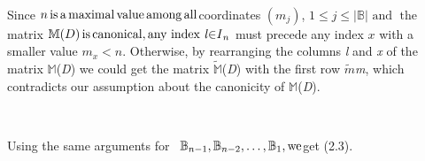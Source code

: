 \documentclass{article}
\newcommand{\infixand}{\text{ and }}
\newcommand{\tmem}[1]{{\em #1\/}}
\newcommand{\tmop}[1]{\ensuremath{\operatorname{#1}}}
\newenvironment{tmparmod}[3]{\begin{list}{}{\setlength{\topsep}{0pt}\setlength{\leftmargin}{#1}\setlength{\rightmargin}{#2}\setlength{\parindent}{#3}\setlength{\listparindent}{\parindent}\setlength{\itemindent}{\parindent}\setlength{\parsep}{\parskip}} \item[]}{\end{list}}
\begin{document}
\

\begin{tmparmod}{0pt}{0pt}{0tab}%
  Since $n \tmop{is} \text{a{\tmem{}}} \tmop{maximal} \tmop{value}
  \tmop{among} \tmop{all}$coordinates $(m_j)$, $1 \leqslant j \leqslant |
  \mathbb{B} | \infixand \tmop{the}$matrix $\mathbb{M} (D) \tmop{is}
  \tmop{canonical}, \text{any index {\tmem{l}}{\tmem{$\in$I}}$_n$}$ must
  precede any index $x$ with a smaller value $m_x < n.$ Otherwise, by
  rearranging the columns{\tmem{ l}} and {\tmem{x}} of the matrix
  \ensuremath{\mathbb{M}}({\tmem{D}}) we could get the matrix
  $\tilde{\mathbb{M}}$({\tmem{D}}) with the first row
  $\widetilde{m}${\succ}{\nobreak}{\tmem{m}}, which contradicts our assumption
  about the canonicity of \ensuremath{\mathbb{M}}({\tmem{D}}). \
  
  \
  
  Using the same arguments for \ ${\nobreak} \text{{\nobreak}} \mathbb{B}_{n
  - 1}, {\nobreak} \text{{\nobreak}} \mathbb{B}_{n - 2}, \ldots, {\nobreak}
  \text{{\nobreak}} \mathbb{B}_1, \tmop{we}$get (2.3).
  
  \ 
\end{tmparmod}
\end{document}
